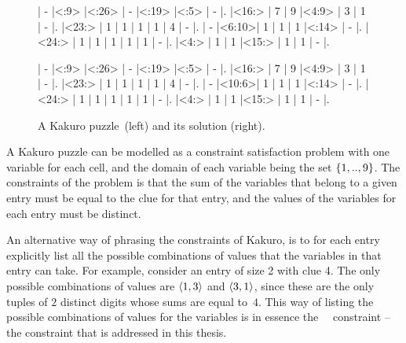 \documentclass[a4paper,11pt]{article}
\newcommand{\Table}{\Constraint{Table}~}
\numberwithin{equation}{section}
\begin{document}
\begin{figure}
  \centering
  \begin{minipage}{.45\textwidth}
    \begin{Kakuro}{6}{6}
      |  -   |<:9>  |<:26> |  -   |<:19> |<:5>  |  -   |.
      |<16:> |  7   |  9   |<4:9> |  3   |  1   |  -   |.
      |<23:> |  1   |  1   |  1   |  1   |  4   |  -   |.
      |  -   |<6:10>|  1   |  1   |  1   |<:14> |  -   |.
      |<24:> |  1   |  1   |  1   |  1   |  1   |  -   |.
      |<4:>  |  1   |  1   |<15:> |  1   |  1   |  -   |.
    \end{Kakuro}
  \end{minipage}
  \begin{minipage}{.45\textwidth}
    \PuzzleSolution
    \begin{Kakuro}{6}{6}
      |  -   |<:9>  |<:26> |  -   |<:19> |<:5>  |  -   |.
      |<16:> |  7   |  9   |<4:9> |  3   |  1   |  -   |.
      |<23:> |  1   |  1   |  1   |  1   |  4   |  -   |.
      |  -   |<10:6>|  1   |  1   |  1   |<:14> |  -   |.
      |<24:> |  1   |  1   |  1   |  1   |  1   |  -   |.
      |<4:>  |  1   |  1   |<15:> |  1   |  1   |  -   |.
    \end{Kakuro}
  \end{minipage}
  \caption{A Kakuro puzzle~\protect\footnotemark (left) and its solution (right).}
\end{figure}


A Kakuro puzzle can be modelled as a constraint satisfaction problem with one variable
for each cell, and the domain of each variable being the set $\left\{1,..,9\right\}$.
The constraints of the problem is that the sum of the variables that
belong to a given entry must be equal to the clue for that entry, and the
values of the variables for each entry must be distinct.

An alternative way of phrasing the constraints of Kakuro, is to for each entry
explicitly list all the possible combinations
of values that the variables in that entry can take.
For example, consider an entry of size 2 with clue 4. The only
possible combinations of values are $\left\langle1,3\right\rangle$ and $\left\langle3,1\right\rangle$, since
these are the only tuples of $2$ distinct digits whose sums are 
equal to~$4$. This way of listing the possible combinations of 
values for the variables is in essence the 
\Table~constraint -- the constraint that is
addressed in this thesis.
\end{document}
